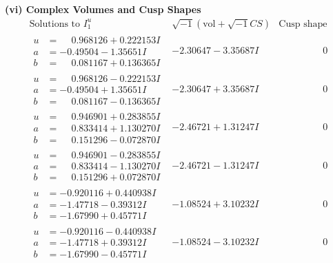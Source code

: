 \documentclass[1p]{elsarticle_modified}
\theoremstyle{definition}
\newcommand{\I}{\sqrt{-1}}
\begin{document}
\newpage\flushleft \textbf{(vi) Complex Volumes and Cusp Shapes}
$$\begin{array}{c|c|c}  
\text{Solutions to }I^u_{1}& \I (\text{vol} + \sqrt{-1}CS) & \text{Cusp shape}\\
 \hline 
\begin{aligned}
u &= \phantom{-}0.968126 + 0.222153 I \\
a &= -0.49504 - 1.35651 I \\
b &= \phantom{-}0.081167 + 0.136365 I\end{aligned}
 & -2.30647 - 3.35687 I & \phantom{-0.000000 } 0 \\ \hline\begin{aligned}
u &= \phantom{-}0.968126 - 0.222153 I \\
a &= -0.49504 + 1.35651 I \\
b &= \phantom{-}0.081167 - 0.136365 I\end{aligned}
 & -2.30647 + 3.35687 I & \phantom{-0.000000 } 0 \\ \hline\begin{aligned}
u &= \phantom{-}0.946901 + 0.283855 I \\
a &= \phantom{-}0.833414 + 1.130270 I \\
b &= \phantom{-}0.151296 - 0.072870 I\end{aligned}
 & -2.46721 + 1.31247 I & \phantom{-0.000000 } 0 \\ \hline\begin{aligned}
u &= \phantom{-}0.946901 - 0.283855 I \\
a &= \phantom{-}0.833414 - 1.130270 I \\
b &= \phantom{-}0.151296 + 0.072870 I\end{aligned}
 & -2.46721 - 1.31247 I & \phantom{-0.000000 } 0 \\ \hline\begin{aligned}
u &= -0.920116 + 0.440938 I \\
a &= -1.47718 - 0.39312 I \\
b &= -1.67990 + 0.45771 I\end{aligned}
 & -1.08524 + 3.10232 I & \phantom{-0.000000 } 0 \\ \hline\begin{aligned}
u &= -0.920116 - 0.440938 I \\
a &= -1.47718 + 0.39312 I \\
b &= -1.67990 - 0.45771 I\end{aligned}
 & -1.08524 - 3.10232 I & \phantom{-0.000000 } 0 \\ \hline\begin{aligned}

\end{aligned}
\end{array}$$
\end{document}
